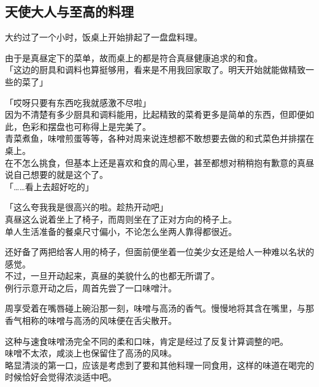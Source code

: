 ﻿\subsection{天使大人与至高的料理}

大约过了一个小时，饭桌上开始排起了一盘盘料理。

由于是真昼定下的菜单，故而桌上的都是符合真昼健康追求的和食。\\

「这边的厨具和调料也算挺够用，看来是不用我回家取了。明天开始就能做精致一些的菜了」

「哎呀只要有东西吃我就感激不尽啦」\\

因为不清楚有多少厨具和调料能用，比起精致的菜肴更多是简单的东西，但即便如此，色彩和摆盘也可称得上是完美了。\\

青菜煮鱼，味噌煎蛋等等，各种对周来说连想都不敢想要去做的和式菜色并排摆在桌上。\\

在不怎么挑食，但基本上还是喜欢和食的周心里，甚至都想对稍稍抱有歉意的真昼说自己想要的就是这个了。\\

「……看上去超好吃的」

「这么夸我我是很高兴的啦。趁热开动吧」\\

真昼这么说着坐上了椅子，而周则坐在了正对方向的椅子上。\\

单人生活准备的餐桌尺寸偏小，不论怎么坐两人靠得都很近。

还好备了两把给客人用的椅子，但面前便坐着一位美少女还是给人一种难以名状的感觉。\\

不过，一旦开动起来，真昼的美貌什么的也都无所谓了。\\

例行示意开动之后，周首先尝了一口味噌汁。

周享受着在嘴唇碰上碗沿那一刻，味噌与高汤的香气。慢慢地将其含在嘴里，与那香气相称的味噌与高汤的风味便在舌尖散开。

这种与速食味噌汤完全不同的柔和口味，肯定是经过了反复计算调整的吧。\\

味噌不太浓，咸淡上也保留住了高汤的风味。\\

略显清淡的第一口，应该是考虑到了要和其他料理一同食用，这样的味道在喝完的时候恰好会觉得浓淡适中吧。\\

